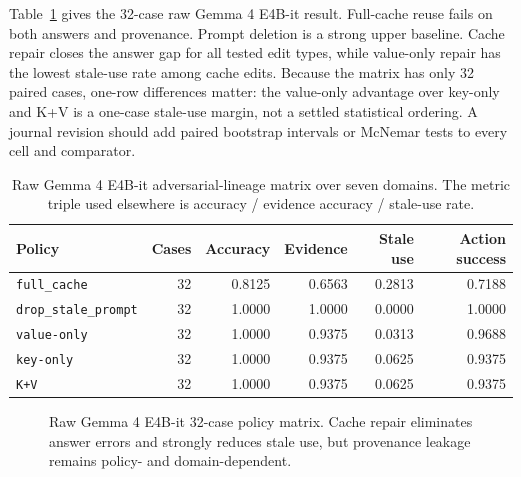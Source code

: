 \documentclass[11pt]{article}
\newcommand{\fullcache}{\texttt{full\_cache}}
\newcommand{\promptdelete}{\texttt{drop\_stale\_prompt}}
\newcommand{\valueedit}{\texttt{value-only}}
\newcommand{\keyedit}{\texttt{key-only}}
\newcommand{\kvedit}{\texttt{K+V}}
\newcommand{\gemma}{Gemma 4 E4B-it}
\begin{document}
Table~\ref{tab:gemma-main} gives the 32-case raw \gemma{} result. Full-cache
reuse fails on both answers and provenance. Prompt deletion is a strong upper
baseline. Cache repair closes the answer gap for all tested edit types, while
value-only repair has the lowest stale-use rate among cache edits.
Because the matrix has only 32 paired cases, one-row differences matter: the
value-only advantage over key-only and K+V is a one-case stale-use margin, not
a settled statistical ordering. A journal revision should add paired bootstrap
intervals or McNemar tests to every cell and comparator.

\begin{table}[H]
\centering
\small
\begin{tabular}{lrrrrr}
\toprule
\textbf{Policy} & \textbf{Cases} & \textbf{Accuracy} & \textbf{Evidence} & \textbf{Stale use} & \textbf{Action success} \\
\midrule
\fullcache & 32 & 0.8125 & 0.6563 & 0.2813 & 0.7188 \\
\promptdelete & 32 & 1.0000 & 1.0000 & 0.0000 & 1.0000 \\
\valueedit & 32 & 1.0000 & 0.9375 & 0.0313 & 0.9688 \\
\keyedit & 32 & 1.0000 & 0.9375 & 0.0625 & 0.9375 \\
\kvedit & 32 & 1.0000 & 0.9375 & 0.0625 & 0.9375 \\
\bottomrule
\end{tabular}
\caption{Raw \gemma{} adversarial-lineage matrix over seven domains. The
metric triple used elsewhere is accuracy / evidence accuracy / stale-use rate.}
\label{tab:gemma-main}
\end{table}

\begin{figure}[H]
\centering
{}
\caption{Raw \gemma{} 32-case policy matrix. Cache repair eliminates answer
errors and strongly reduces stale use, but provenance leakage remains policy-
and domain-dependent.}
\label{fig:gemma-bars}
\end{figure}
\end{document}
